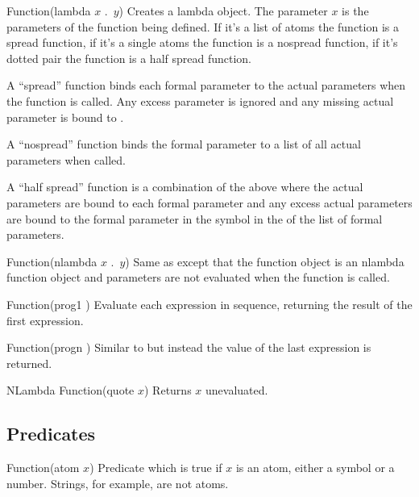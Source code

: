 \begin{defun}{Function}{(lambda $x$ .\ $y$)}
  Creates a lambda object. The parameter $x$ is the parameters of the
  function being defined. If it's a list of atoms the function is a
  spread function, if it's a single atoms the function is a nospread
  function, if it's dotted pair the function is a half spread
  function.

  A ``spread'' function binds each formal parameter to the actual
  parameters when the function is called. Any excess parameter is
  ignored and any missing actual parameter is bound to \NIL.

  A ``nospread'' function binds the formal parameter to a list of all
  actual parameters when called.

  A ``half spread'' function is a combination of the above where the
  actual parameters are bound to each formal parameter and any excess
  actual parameters are bound to the formal parameter in the
  symbol in the  of the list of formal parameters.
\end{defun}

\begin{defun}{Function}{(nlambda $x$ .\ $y$)}
  Same as  except that the function object is an nlambda
  function object and parameters are not evaluated when the function
  is called.
\end{defun}

\begin{defun}{Function}{(prog1 \xargs)}
  Evaluate each expression in sequence, returning the result of the
  first expression.
\end{defun}

\begin{defun}{Function}{(progn \xargs)}
  Similar to  but instead the value of the last expression
  is returned.
\end{defun}


\begin{defun}{NLambda Function}{(quote $x$)}
  Returns $x$ unevaluated.
\end{defun}

\subsection{Predicates}

\begin{defun}{Function}{(atom $x$)}
  Predicate which is true if $x$ is an atom, either a symbol or a
  number. Strings, for example, are not atoms.
\end{defun}

